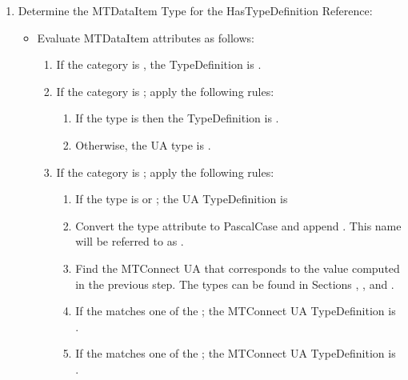 \begin{enumerate}
  \item Determine the \gls{MTDataItem} \gls{Type} for the \gls{HasTypeDefinition} \gls{Reference}:
  \begin{itemize}
    \item Evaluate \gls{MTDataItem} attributes as follows:
    \begin{enumerate}
      \setlength\itemsep{1em}
      \item If the \gls{category} is , the \gls{TypeDefinition} is .
      
      \item If the \gls{category} is ; apply the following rules:
      \begin{enumerate}
        \item If the \gls{type} is  then the \gls{TypeDefinition} is .
        \item Otherwise, the UA type is .
      \end{enumerate}
      
      \item If the \gls{category} is ; apply the following rules:
      \begin{enumerate}
        \setlength\itemsep{1em}
        \item If the \gls{type} is  or ; the UA \gls{TypeDefinition} is 
        
        \item Convert the \gls{type} attribute to \gls{PascalCase} and append . This name will be referred to as .
        
        \item Find the MTConnect UA  that corresponds to the value computed in the previous step.
        The types can be found in Sections , , and .
        
        \item If the  matches one of the ; the MTConnect UA \gls{TypeDefinition} is .
        
        \item If the  matches one of the ; the MTConnect UA \gls{TypeDefinition}  is .
        

\end{enumerate}
\end{enumerate}
\end{itemize}
\end{enumerate}
